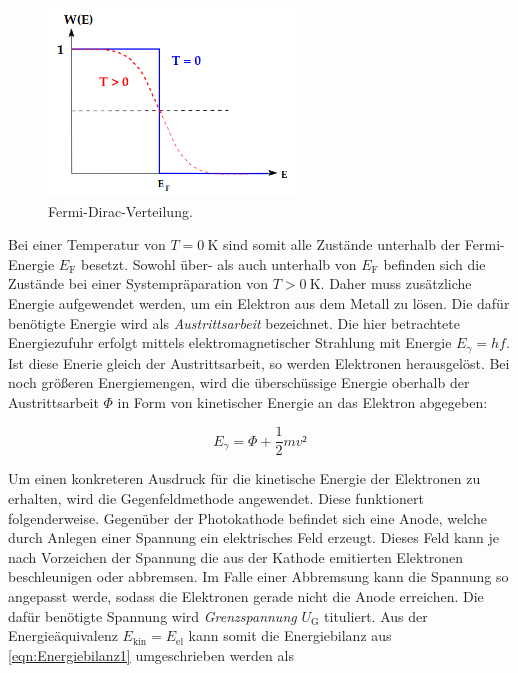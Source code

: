 \begin{figure}
    \centering
    \includegraphics[height=5cm]{FDV.png}
    \caption{Fermi-Dirac-Verteilung\cite{Versuchsanleitung_v500}.}
    \label{fig:FDV}
\end{figure}

\noindent Bei einer Temperatur von $T = \qty{0}{\kelvin}$ sind somit alle Zustände unterhalb der Fermi-Energie $E_\text{F}$ besetzt. Sowohl über- als auch unterhalb 
von $E_\text{F}$ befinden sich die Zustände bei einer Systempräparation von $T > \qty{0}{\kelvin}$. Daher muss zusätzliche Energie aufgewendet werden, um ein Elektron 
aus dem Metall zu lösen. Die dafür benötigte Energie wird als \emph{Austrittsarbeit} bezeichnet. Die hier betrachtete Energiezufuhr erfolgt mittels elektromagnetischer 
Strahlung mit Energie $E_\gamma = hf$. Ist diese Enerie gleich der Austrittsarbeit, so werden Elektronen herausgelöst. Bei noch größeren Energiemengen, wird die
überschüssige Energie oberhalb der Austrittsarbeit $\Phi$ in Form von kinetischer Energie an das Elektron abgegeben:

\begin{equation}
    E_\gamma = \Phi + \frac{1}{2}mv²
\label{eqn:Energiebilanz1}
\end{equation}

\noindent Um einen konkreteren Ausdruck für die kinetische Energie der Elektronen zu erhalten, wird die Gegenfeldmethode angewendet. Diese funktionert folgenderweise.
Gegenüber der Photokathode befindet sich eine Anode, welche durch Anlegen einer Spannung ein elektrisches Feld erzeugt. Dieses Feld kann je nach Vorzeichen der Spannung 
die aus der Kathode emitierten Elektronen beschleunigen oder abbremsen. Im Falle einer Abbremsung kann die Spannung so angepasst werde, sodass die Elektronen gerade nicht 
die Anode erreichen. Die dafür benötigte Spannung wird \emph{Grenzspannung} $U_\text{G}$ tituliert. Aus der Energieäquivalenz $E_\text{kin} =  E_\text{el}$ kann somit die 
Energiebilanz aus \eqref{eqn:Energiebilanz1} umgeschrieben werden als 

